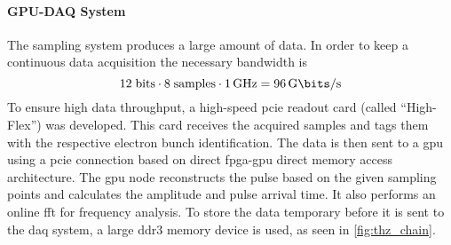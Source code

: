 \paragraph{GPU-DAQ System}
The sampling system produces a large amount of data.
In order to keep a continuous data  acquisition the necessary bandwidth is 
\begin{equation}
	12\;\text{bits} \cdot 8 \; \text{samples} \cdot \SI{1}{\GHz} = \SI{96}{\giga \bits \per \second}
\end{equation}
To ensure high data throughput, a high-speed \gls{pcie} readout card (called ``High-Flex'') was developed.
This card receives the acquired samples and tags them with the respective electron bunch identification. 
The data is then sent to a \gls{gpu} using a \gls{pcie} connection based on direct \gls{fpga}-\gls{gpu} direct memory access architecture.
The \gls{gpu} node reconstructs the pulse based on the given sampling points and calculates the amplitude and pulse arrival time. 
It also performs an online \gls{fft} for frequency analysis.
To store the data temporary before it is sent to the \gls{daq} system, a large \gls{ddr3} memory device is used, as seen in \autoref{fig:thz_chain}. \cite{caselleKAP}


